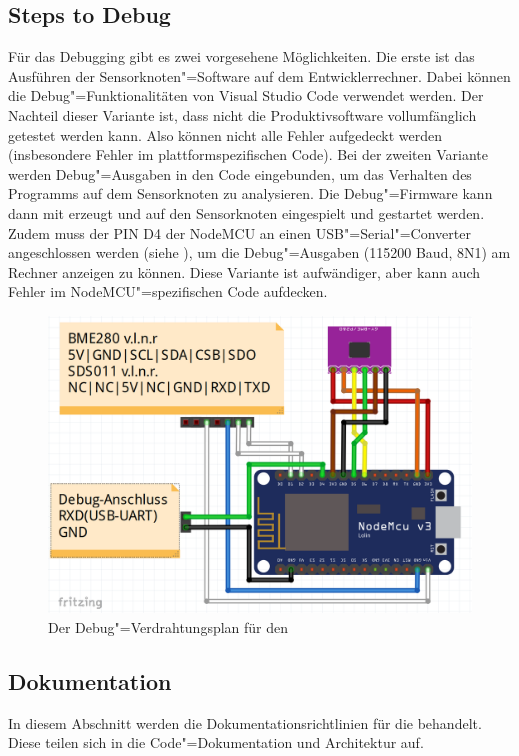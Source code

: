 \subsection{Steps to Debug}
Für das Debugging gibt es zwei vorgesehene Möglichkeiten.
Die erste ist das Ausführen der Sensorknoten"=Software auf dem Entwicklerrechner.
Dabei können die Debug"=Funktionalitäten von Visual Studio Code verwendet werden.
Der Nachteil dieser Variante ist, dass nicht die Produktivsoftware vollumfänglich getestet werden kann.
Also können nicht alle Fehler aufgedeckt werden (insbesondere Fehler im plattformspezifischen Code).
Bei der zweiten Variante werden Debug"=Ausgaben in den Code eingebunden, um das Verhalten des Programms auf dem Sensorknoten zu analysieren.
Die Debug"=Firmware kann dann mit   erzeugt und auf den Sensorknoten eingespielt und gestartet werden.
Zudem muss der PIN D4 der NodeMCU an einen USB"=Serial"=Converter angeschlossen werden (siehe ), um die Debug"=Ausgaben (115200 Baud, 8N1) am Rechner anzeigen zu können.
Diese Variante ist aufwändiger, aber kann auch Fehler im NodeMCU"=spezifischen Code aufdecken.

\begin{figure}[htb]
	\centering
	\includegraphics[width=0.7\linewidth]{./ressourcen/Prod_Verdrahtungsplan_Debug}
	\caption{Der Debug"=Verdrahtungsplan für den \sk}
	\label{fig:skwiringdebug}
\end{figure}

\subsection{Dokumentation}
In diesem Abschnitt werden die Dokumentationsrichtlinien für die \skk behandelt.
Diese teilen sich in die Code"=Dokumentation und Architektur auf.

